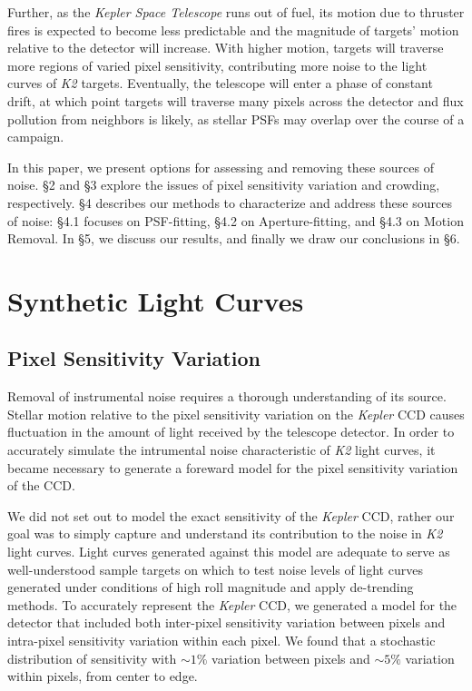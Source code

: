 \documentclass[12pt,preprint]{aastex}
\begin{document}
Further, as the \textit{Kepler Space Telescope} runs out of fuel, its motion due to thruster fires is expected to become less predictable and the magnitude of targets' motion relative to the detector will increase. With higher motion, targets will traverse more regions of varied pixel sensitivity, contributing more noise to the light curves of \textit{K2} targets. Eventually, the telescope will enter a phase of constant drift, at which point targets will traverse many pixels across the detector and flux pollution from neighbors is likely, as stellar PSFs may overlap over the course of a campaign.

In this paper, we present options for assessing and removing these sources of noise. \S 2 and \S 3 explore the issues of pixel sensitivity variation and crowding, respectively. \S 4 describes our methods to characterize and address these sources of noise: \S 4.1 focuses on PSF-fitting, \S 4.2 on Aperture-fitting, and \S 4.3 on Motion Removal. In \S 5, we discuss our results, and finally we draw our conclusions in \S 6.

\section{Synthetic Light Curves}

\subsection{Pixel Sensitivity Variation}

Removal of instrumental noise requires a thorough understanding of its source. Stellar motion relative to the pixel sensitivity variation on the \textit{Kepler} CCD causes fluctuation in the amount of light received by the telescope detector. In order to accurately simulate the intrumental noise characteristic of \textit{K2} light curves, it became necessary to generate a foreward model for the pixel sensitivity variation of the CCD.

We did not set out to model the exact sensitivity of the \textit{Kepler} CCD, rather our goal was to simply capture and understand its contribution to the noise in \textit{K2} light curves. Light curves generated against this model are adequate to serve as well-understood sample targets on which to test noise levels of light curves generated under conditions of high roll magnitude and apply de-trending methods. To accurately represent the \textit{Kepler} CCD, we generated a model for the detector that included both inter-pixel sensitivity variation between pixels and intra-pixel sensitivity variation within each pixel. We found that a stochastic distribution of sensitivity with ${\sim}1\%$ variation between pixels and ${\sim}5\%$ variation within pixels, from center to edge.
\end{document}
